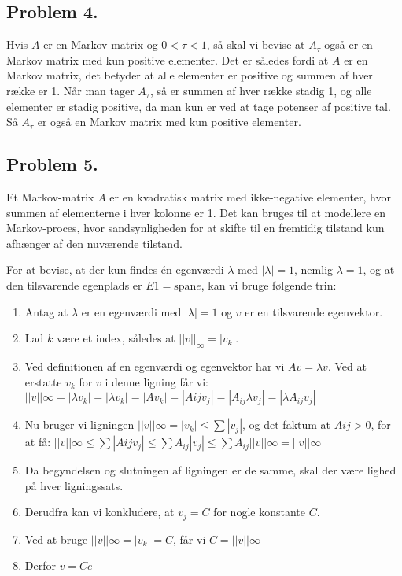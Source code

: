 \subsection*{Problem 4.}

Hvis $A$ er en Markov matrix og $0 < \tau < 1$, så skal vi bevise at $A_{\tau}$ også er en Markov matrix med kun positive elementer. Det er således fordi at $A$ er en Markov matrix, det betyder at alle elementer er positive og summen af hver række er 1. Når man tager $A_{\tau}$, så er summen af hver række stadig 1, og alle elementer er stadig positive, da man kun er ved at tage potenser af positive tal. Så $A_{\tau}$ er også en Markov matrix med kun positive elementer.

\subsection*{Problem 5.}

Et Markov-matrix $A$ er en kvadratisk matrix med ikke-negative elementer, hvor summen af elementerne i hver kolonne er 1. Det kan bruges til at modellere en Markov-proces, hvor sandsynligheden for at skifte til en fremtidig tilstand kun afhænger af den nuværende tilstand.

For at bevise, at der kun findes én egenværdi $\lambda$ med $|\lambda| = 1$, nemlig $\lambda = 1$, og at den tilsvarende egenplads er $E1 = \text{span}{e}$, kan vi bruge følgende trin:
\begin{enumerate}
\item Antag at $\lambda$ er en egenværdi med $|\lambda| = 1$ og $v$ er en tilsvarende egenvektor.
\item Lad $k$ være et index, således at $||v||_{\infty} = |v_k|$.
\item Ved definitionen af en egenværdi og egenvektor har vi $Av = \lambda v$. Ved at erstatte $v_k$ for $v$ i denne ligning får vi:
$||v||{\infty} = |\lambda v_k| = |\lambda v_k| = |A v_k| = |A{ij} v_j| = |A_{ij} \lambda v_j| = |\lambda A_{ij} v_j|$
\item Nu bruger vi ligningen $||v||{\infty} = |v_k| \leq \sum |v_j|$, og det faktum at $A{ij} > 0$, for at få:
$||v||{\infty} \leq \sum |A{ij} v_j| \leq \sum A_{ij}|v_j| \leq \sum A_{ij}||v||{\infty} = ||v||{\infty}$
\item Da begyndelsen og slutningen af ligningen er de samme, skal der være lighed på hver ligningssats.
\item Derudfra kan vi konkludere, at $v_j = C$ for nogle konstante $C$.
\item Ved at bruge $||v||{\infty} = |v_k| = C$, får vi $C = ||v||{\infty}$
\item Derfor $v = Ce$
\end{enumerate}


